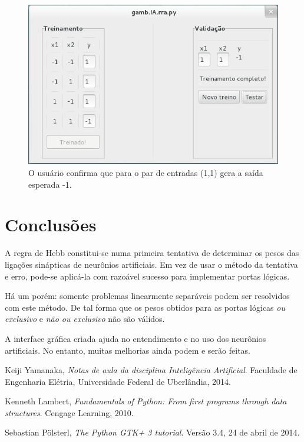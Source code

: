 \documentclass[11pt]{article}
\begin{document}
\begin{figure}[p]
\begin{center}
\includegraphics[scale=0.6]{figuras/gamb5}
\caption{O usuário confirma que para o par de entradas (1,1) gera a saída esperada -1.}\label{fig:gamb5}
\end{center}
\end{figure}

\section{Conclusões}

A regra de Hebb constitui-se numa primeira tentativa de determinar os pesos das ligações sinápticas de neurônios artificiais. Em vez de usar o método da tentativa e erro, pode-se aplicá-la com razoável sucesso para implementar portas lógicas.

Há um porém: somente problemas linearmente separáveis podem ser resolvidos com este método. De tal forma que os pesos obtidos para as portas lógicas \emph{ou exclusivo} e \emph{não ou exclusivo} não são válidos.

A interface gráfica criada ajuda no entendimento e no uso dos neurônios artificiais. No entanto, muitas melhorias ainda podem e serão feitas.

\newpage
\begin{thebibliography}{3}

  Keiji Yamanaka,
  \emph{Notas de aula da disciplina Inteligência Artificial}.
  Faculdade de Engenharia Elétria, Universidade Federal de Uberlândia, 2014.

  Kenneth Lambert,
  \emph{Fundamentals of Python: From first programs through data structures}.
  Cengage Learning, 2010.

  Sebastian Pölsterl,
  \emph{The Python GTK+ 3 tutorial}. Versão 3.4, 24 de abril de 2014.

\end{thebibliography}

\newpage
\appendix
\appendixpage
\addappheadtotoc



%
\end{document}
